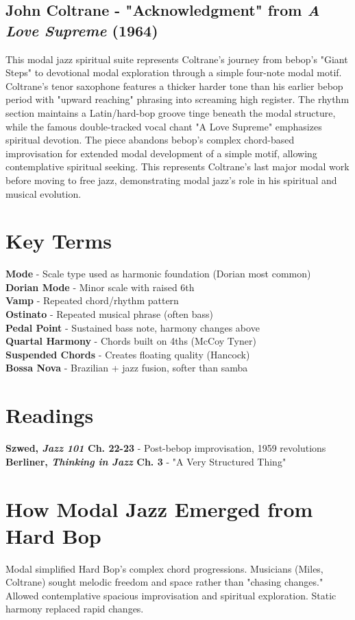 \documentclass[11pt]{article}
\begin{document}
\subsection*{John Coltrane - "Acknowledgment" from \emph{A Love Supreme} (1964)}
This modal jazz spiritual suite represents Coltrane's journey from bebop's "Giant Steps" to devotional modal exploration through a simple four-note modal motif. Coltrane's tenor saxophone features a thicker harder tone than his earlier bebop period with "upward reaching" phrasing into screaming high register. The rhythm section maintains a Latin/hard-bop groove tinge beneath the modal structure, while the famous double-tracked vocal chant "A Love Supreme" emphasizes spiritual devotion. The piece abandons bebop's complex chord-based improvisation for extended modal development of a simple motif, allowing contemplative spiritual seeking. This represents Coltrane's last major modal work before moving to free jazz, demonstrating modal jazz's role in his spiritual and musical evolution.

\section*{Key Terms}

\textbf{Mode} - Scale type used as harmonic foundation (Dorian most common) \\
\textbf{Dorian Mode} - Minor scale with raised 6th \\
\textbf{Vamp} - Repeated chord/rhythm pattern \\
\textbf{Ostinato} - Repeated musical phrase (often bass) \\
\textbf{Pedal Point} - Sustained bass note, harmony changes above \\
\textbf{Quartal Harmony} - Chords built on 4ths (McCoy Tyner) \\
\textbf{Suspended Chords} - Creates floating quality (Hancock) \\
\textbf{Bossa Nova} - Brazilian + jazz fusion, softer than samba

\section*{Readings}

\textbf{Szwed, \emph{Jazz 101} Ch. 22-23} - Post-bebop improvisation, 1959 revolutions \\
\textbf{Berliner, \emph{Thinking in Jazz} Ch. 3} - "A Very Structured Thing"

\section*{How Modal Jazz Emerged from Hard Bop}

Modal simplified Hard Bop's complex chord progressions. Musicians (Miles, Coltrane) sought melodic freedom and space rather than "chasing changes." Allowed contemplative spacious improvisation and spiritual exploration. Static harmony replaced rapid changes.
\end{document}
